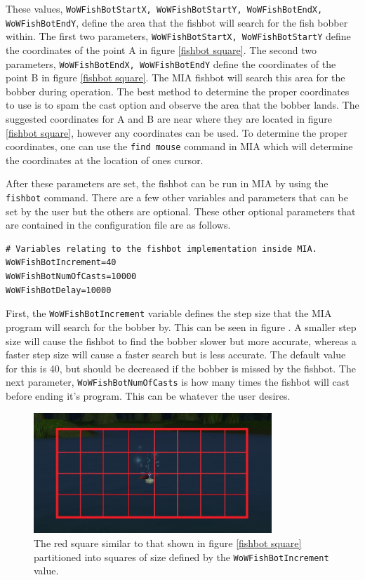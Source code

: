 These values, \texttt{WoWFishBotStartX, WoWFishBotStartY, WoWFishBotEndX, WoWFishBotEndY}, define the area that the fishbot will search for the fish bobber within. The first two parameters, \texttt{WoWFishBotStartX, WoWFishBotStartY} define the coordinates of the point A in figure \ref{fishbot square}. The second two parameters, \texttt{WoWFishBotEndX, WoWFishBotEndY} define the coordinates of the point B in figure \ref{fishbot square}. The MIA fishbot will search this area for the bobber during operation. The best method to determine the proper coordinates to use is to spam the cast option and observe the area that the bobber lands. The suggested coordinates for A and B are near where they are located in figure \ref{fishbot square}, however any coordinates can be used. To determine the proper coordinates, one can use the \texttt{find mouse} command in MIA which will determine the coordinates at the location of ones cursor.

After these parameters are set, the fishbot can be run in MIA by using the \texttt{fishbot} command. There are a few other variables and parameters that can be set by the user but the others are optional. These other optional parameters that are contained in the configuration file are as follows.

\begin{lstlisting}
# Variables relating to the fishbot implementation inside MIA.
WoWFishBotIncrement=40
WoWFishBotNumOfCasts=10000
WoWFishBotDelay=10000
\end{lstlisting}

First, the \texttt{WoWFishBotIncrement} variable defines the step size that the MIA program will search for the bobber by. This can be seen in figure \label{fishbot increments}. A smaller step size will cause the fishbot to find the bobber slower but more accurate, whereas a faster step size will cause a faster search but is less accurate. The default value for this is 40, but should be decreased if the bobber is missed by the fishbot. The next parameter, \texttt{WoWFishBotNumOfCasts} is how many times the fishbot will cast before ending it's program. This can be whatever the user desires. 



\begin{figure}[h]
	\centering
	\includegraphics[width=0.8\textwidth]{images/WoWScrnShot_040118_234227b.jpg}
	\caption{The red square similar to that shown in figure \ref{fishbot square} partitioned into squares of size defined by the \texttt{WoWFishBotIncrement} value.} \label{fishbot increments}
\end{figure}

